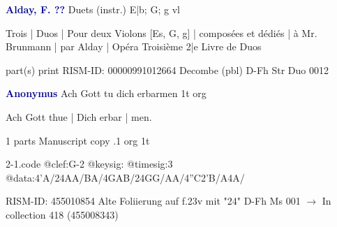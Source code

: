 \documentclass[twocolumn]{book}
\begin{document}
\newline \par \vspace{7pt} \textcolor{darkblue}{\textbf{Alday, F.  ??}}
\newline Duets (instr.)  E|b; G; g  
 vl
\newline \begin{itshape}Trois | Duos | Pour deux Violons [Es, G, g] | composées et dédiés | à Mr. Brunmann | par Alday | Opéra Troisième 2|e Livre de Duos\end{itshape} 
\newline \textcolor{darkblue}{}  part(s)  
\newline print
\newline RISM-ID: 00000991012664
\newline Decombe  (pbl)
\newline D-Fh  Str Duo 0012
\newline \par \vspace{7pt} \textcolor{darkblue}{\textbf{Anonymus  }}
\newline Ach Gott tu dich erbarmen  1t  
\newline org
\newline \begin{itshape}[f.23v, at left:] Ach Gott thue | Dich erbar | men.\end{itshape} 
\newline \textcolor{darkblue}{}  1 parts  
\newline Manuscript copy
.1  org  1t  
\begin{filecontents*}{2-1.code}
@clef:G-2
@keysig:
@timesig:3
@data:4'A/24AA/BA/4GAB/24GG/AA/4''C2'B/A4A/
\end{filecontents*}
\newline
%

\newline RISM-ID: 455010854
\newline Alte Foliierung auf f.23v mit "24"
\newline D-Fh  Ms 001
\newline $\rightarrow$ In collection 418 (455008343)
\end{document}
